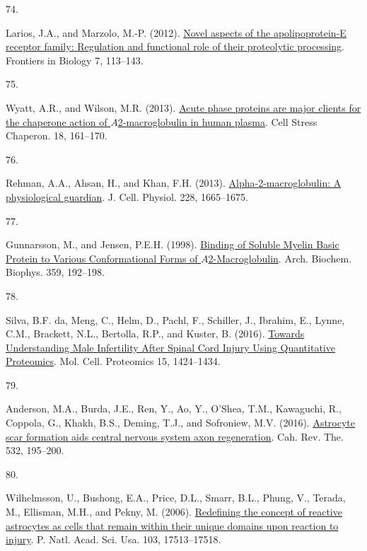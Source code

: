 \documentclass[
]{article}
\newlength{\cslhangindent}
\newlength{\csllabelwidth}
\newlength{\cslentryspacingunit} %
\newenvironment{CSLReferences}[2] %
 {%
  \setlength{\parindent}{0pt}
  \ifodd #1
  \let\oldpar\par
  \def\par{\hangindent=\cslhangindent\oldpar}
  \fi
  \setlength{\parskip}{#2\cslentryspacingunit}
 }%
 {}
\newcommand{\CSLLeftMargin}[1]{\parbox[t]{\csllabelwidth}{#1}}
\newcommand{\CSLRightInline}[1]{\parbox[t]{\linewidth - \csllabelwidth}{#1}\break}
\begin{document}
\begin{CSLReferences}{0}{0}
\leavevmode{}%
\CSLLeftMargin{74. }
\CSLRightInline{Larios, J.A., and Marzolo, M.-P. (2012). \href{https://doi.org/10.1007/s11515-011-1186-7}{Novel aspects of the apolipoprotein-{E} receptor family: Regulation and functional role of their proteolytic processing}. Frontiers in Biology 7, 113--143.}

\leavevmode{}%
\CSLLeftMargin{75. }
\CSLRightInline{Wyatt, A.R., and Wilson, M.R. (2013). \href{https://doi.org/10.1007/s12192-012-0365-z}{Acute phase proteins are major clients for the chaperone action of {\(A\)}2-macroglobulin in human plasma}. Cell Stress Chaperon. 18, 161--170.}

\leavevmode{}%
\CSLLeftMargin{76. }
\CSLRightInline{Rehman, A.A., Ahsan, H., and Khan, F.H. (2013). \href{https://doi.org/10.1002/jcp.24266}{Alpha-2-macroglobulin: {A} physiological guardian}. J. Cell. Physiol. 228, 1665--1675.}

\leavevmode{}%
\CSLLeftMargin{77. }
\CSLRightInline{Gunnarsson, M., and Jensen, P.E.H. (1998). \href{https://doi.org/10.1006/abbi.1998.0902}{Binding of {Soluble Myelin Basic Protein} to {Various Conformational Forms} of {\(A\)}2-{Macroglobulin}}. Arch. Biochem. Biophys. 359, 192--198.}

\leavevmode{}%
\CSLLeftMargin{78. }
\CSLRightInline{Silva, B.F. da, Meng, C., Helm, D., Pachl, F., Schiller, J., Ibrahim, E., Lynne, C.M., Brackett, N.L., Bertolla, R.P., and Kuster, B. (2016). \href{https://doi.org/10.1074/mcp.M115.052175}{Towards {Understanding Male Infertility After Spinal Cord Injury Using Quantitative Proteomics}}. Mol. Cell. Proteomics 15, 1424--1434.}

\leavevmode{}%
\CSLLeftMargin{79. }
\CSLRightInline{Anderson, M.A., Burda, J.E., Ren, Y., Ao, Y., O'Shea, T.M., Kawaguchi, R., Coppola, G., Khakh, B.S., Deming, T.J., and Sofroniew, M.V. (2016). \href{https://doi.org/10.1038/nature17623}{Astrocyte scar formation aids central nervous system axon regeneration}. Cah. Rev. The. 532, 195--200.}

\leavevmode{}%
\CSLLeftMargin{80. }
\CSLRightInline{Wilhelmsson, U., Bushong, E.A., Price, D.L., Smarr, B.L., Phung, V., Terada, M., Ellisman, M.H., and Pekny, M. (2006). \href{https://doi.org/10.1073/pnas.0602841103}{Redefining the concept of reactive astrocytes as cells that remain within their unique domains upon reaction to injury}. P. Natl. Acad. Sci. Usa. 103, 17513--17518.}


\end{CSLReferences}
\end{document}
